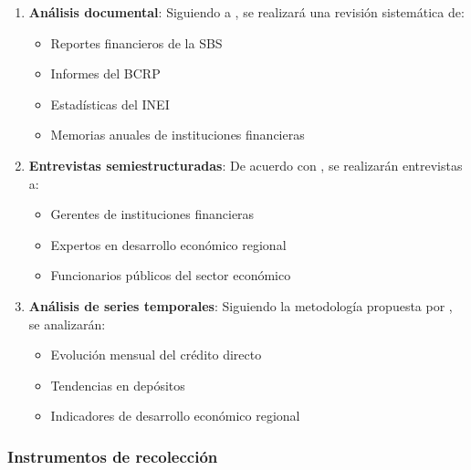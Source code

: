 \documentclass[12pt, a4paper]{article}
\begin{document}
\begin{enumerate}
    \item \textbf{Análisis documental}: 
    Siguiendo a \textcite{Bailey2023}, se realizará una revisión sistemática de:
    \begin{itemize}
        \item Reportes financieros de la SBS
        \item Informes del BCRP
        \item Estadísticas del INEI
        \item Memorias anuales de instituciones financieras
    \end{itemize}

    \item \textbf{Entrevistas semiestructuradas}:
    De acuerdo con \textcite{Kvale2023}, se realizarán entrevistas a:
    \begin{itemize}
        \item Gerentes de instituciones financieras
        \item Expertos en desarrollo económico regional
        \item Funcionarios públicos del sector económico
    \end{itemize}

    \item \textbf{Análisis de series temporales}:
    Siguiendo la metodología propuesta por \textcite{Box2023}, se analizarán:
    \begin{itemize}
        \item Evolución mensual del crédito directo
        \item Tendencias en depósitos
        \item Indicadores de desarrollo económico regional
    \end{itemize}
\end{enumerate}

\subsubsection{Instrumentos de recolección}
\end{document}
